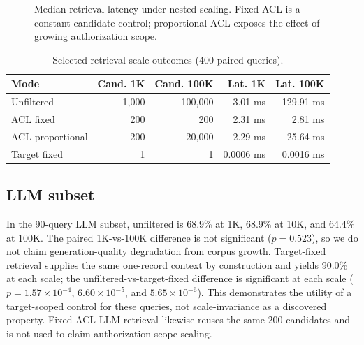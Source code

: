 \begin{figure}[t]
\centering
{}
\caption{Median retrieval latency under nested scaling. Fixed ACL is a constant-candidate control; proportional ACL exposes the effect of growing authorization scope.}
\label{fig:scale_latency}
\end{figure}

\begin{table}[t]
\caption{Selected retrieval-scale outcomes (400 paired queries).}
\label{tab:scale}
\centering
\scriptsize
\begin{tabular}{lrrrr}
\toprule
Mode & Cand. 1K & Cand. 100K & Lat. 1K & Lat. 100K \\
\midrule
Unfiltered & 1,000 & 100,000 & 3.01 ms & 129.91 ms \\
ACL fixed & 200 & 200 & 2.31 ms & 2.81 ms \\
ACL proportional & 200 & 20,000 & 2.29 ms & 25.64 ms \\
Target fixed & 1 & 1 & 0.0006 ms & 0.0016 ms \\
\bottomrule
\end{tabular}
\end{table}

\subsection{LLM subset}
In the 90-query LLM subset, unfiltered \arsr{} is 68.9\% at 1K, 68.9\% at 10K, and 64.4\% at 100K. The paired 1K-vs-100K difference is not significant ($p=0.523$), so we do not claim generation-quality degradation from corpus growth. Target-fixed retrieval supplies the same one-record context by construction and yields 90.0\% at each scale; the unfiltered-vs-target-fixed difference is significant at each scale ($p=1.57\times10^{-4}$, $6.60\times10^{-5}$, and $5.65\times10^{-6}$). This demonstrates the utility of a target-scoped control for these queries, not scale-invariance as a discovered property. Fixed-ACL LLM retrieval likewise reuses the same 200 candidates and is not used to claim authorization-scope scaling.

